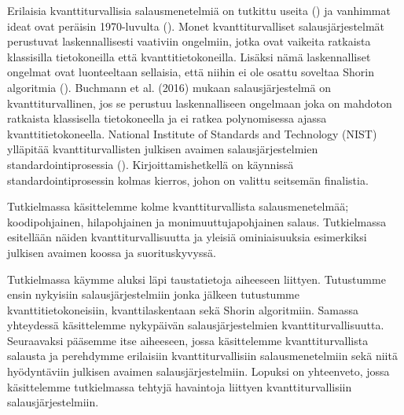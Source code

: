 Erilaisia kvanttiturvallisia salausmenetelmiä on tutkittu useita (\cite{mavroeidis2018impact}) ja vanhimmat ideat ovat peräisin 1970-luvulta (\cite{repka2014overview}). Monet kvanttiturvalliset salausjärjestelmät perustuvat laskennallisesti vaativiin ongelmiin, jotka ovat vaikeita ratkaista klassisilla tietokoneilla että kvanttitietokoneilla. %
Lisäksi nämä laskennalliset ongelmat ovat luonteeltaan sellaisia, että niihin ei ole osattu soveltaa Shorin algoritmia (\cite{bernstein2017post}).
Buchmann et al. (2016) mukaan salausjärjestelmä on kvanttiturvallinen, jos se perustuu laskennalliseen ongelmaan joka on mahdoton ratkaista klassisella tietokoneella ja ei ratkea polynomisessa ajassa kvanttitietokoneella. National Institute of Standards and Technology (NIST) ylläpitää kvanttiturvallisten julkisen avaimen salausjärjestelmien standardointiprosessia (\cite{alagic2020status}). Kirjoittamishetkellä on käynnissä standardointiprosessin kolmas kierros, johon on valittu seitsemän finalistia. 

Tutkielmassa käsittelemme kolme kvanttiturvallista salausmenetelmää; koodipohjainen, hilapohjainen ja monimuuttujapohjainen salaus. Tutkielmassa esitellään näiden kvanttiturvallisuutta ja yleisiä ominiaisuuksia esimerkiksi julkisen avaimen koossa ja suorituskyvyssä.

Tutkielmassa käymme aluksi läpi taustatietoja aiheeseen liittyen. Tutustumme ensin nykyisiin salausjärjestelmiin jonka jälkeen tutustumme kvanttitietokoneisiin, kvanttilaskentaan sekä Shorin algoritmiin. Samassa yhteydessä käsittelemme nykypäivän salausjärjestelmien kvanttiturvallisuutta. Seuraavaksi pääsemme itse aiheeseen, jossa käsittelemme kvanttiturvallista salausta ja perehdymme erilaisiin kvanttiturvallisiin salausmenetelmiin sekä niitä hyödyntäviin julkisen avaimen salausjärjestelmiin. Lopuksi on yhteenveto, jossa käsittelemme tutkielmassa tehtyjä havaintoja liittyen kvanttiturvallisiin salausjärjestelmiin.